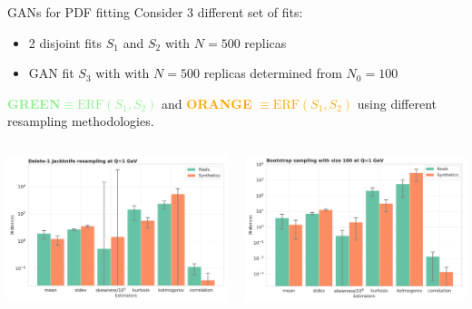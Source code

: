 \begin{frame}{GANs for PDF fitting}
	Consider 3 different set of fits:
	\begin{itemize}
		\item 2 disjoint fits $S_1$ and $S_2$ with $N=500$ replicas
		\item GAN fit $S_3$ with with $N=500$ replicas determined from $N_0=100$
	\end{itemize}
	\textcolor{LightGreen}{\textbf{GREEN}$\equiv \text{ERF}(S_1,S_2)$} and \textcolor{orange}{\textbf{ORANGE}
		$\equiv \text{ERF}(S_1,S_2)$} using different resampling methodologies.
	\begin{columns}[T] 
		\begin{column}{.5\textwidth}
			\includegraphics[width=\linewidth]{./gan_compressor/imgs/jackknife-v1.pdf}
		\end{column}
		\hfill
		\begin{column}{.5\textwidth}	
			\includegraphics[width=\linewidth]{./gan_compressor/imgs/bootstrap.pdf}
		\end{column}
	\end{columns}
\end{frame}
